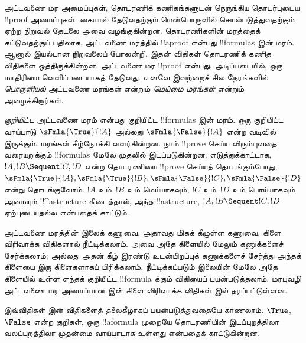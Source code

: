 \documentclass[../../../include/open-logic-section]{subfiles}
\begin{document}


அட்டவணை மர அமைப்புகள், தொடரணிக் கணிதங்களுடன் நெருங்கிய
தொடர்புடைய !!{proof} அமைப்புகள். கையால் தேடுவதற்கும்
மென்பொருளில் செயல்படுத்துவதற்கும் ஏற்ற நிறுவல் தேடலை அவை
வழங்குகின்றன. தொடரணிகளின் மரத்தைக் கட்டுவதற்குப் பதிலாக,
அட்டவணை மரத்தில் !!a{proof} என்பது !!{formula}s இன் மரம்.
ஆனால் இயல்பான நிறுவலைப் போலன்றி, இதன் விதிகள் தொடரணிக்
கணித விதிகளை ஒத்திருக்கின்றன. அட்டவணை மர !!{proof} என்பது,
அடிப்படையில், ஒரு மாதிரியை வெளிப்படையாகத் தேடுவது.
எனவே இவற்றைச் சில நேரங்களில் \emph{பொருளியல்} அட்டவணை
மரங்கள் என்றும் \emph{மெய்மை மரங்கள்} என்றும் அழைக்கிறார்கள்.

\emph{குறியிட்ட} அட்டவணை மரம் என்பது குறியிட்ட
!!{formula}s இன் மரம். ஒரு குறியிட்ட வாய்பாடு
$\sFmla{\True}{!A}$ அல்லது $\sFmla{\False}{!A}$
என்ற வடிவில் இருக்கும். மரங்கள் கீழ்நோக்கி வளர்கின்றன.
நாம் !!{prove} செய்ய விரும்புவதை வரையறுக்கும்
!!{formula}s மேலே முதலில் இடப்படுகின்றன. எடுத்துக்காட்டாக,
$!A, !B \Sequent !C, !D$ என்ற தொடரணியை
!!{prove} செய்யத் தொடங்கும்போது,
$\sFmla{\True}{!A}, \sFmla{\True}{!B},
\sFmla{\False}{!C}, \sFmla{\False}{!D}$
என்று தொடங்குவோம். $!A$ உம்~$!B$ உம் மெய்யாகவும்,
$!C$ உம்~$!D$ உம் பொய்யாகவும் அமையும்
!!^a{structure} கிடைத்தால், அந்த !!a{structure},
$!A, !B \Sequent !C, !D$ ஏற்புடையதல்ல என்பதைக் காட்டும்.

அட்டவணை மரத்தின் இலைக் கணுவை, அதாவது மிகக் கீழுள்ள
கணுவை, கிளை விரிவாக்க விதிகளால் நீட்டிக்கலாம். அவை அதே
கிளையில் மேலும் கணுக்களைச் சேர்க்கலாம்; அல்லது அதன் கீழ்
இரண்டு உடன்பிறப்புக் கணுக்களைச் சேர்த்து அந்தக் கிளையை
இரு கிளைகளாகப் பிரிக்கலாம். நீட்டிக்கப்படும் இலையின்
மேலே அதே கிளையில் உள்ள எந்தக் குறியிட்ட !!{formula}
க்கும் விதியைப் பயன்படுத்தலாம். மரபுவழி அட்டவணை மர
அமைப்பான  இன் கிளை விரிவாக்க விதிகள்
 இல் தரப்பட்டுள்ளன.



இவ்விதிகள்  இன் விதிகளைத் தலைகீழாகப்
பயன்படுத்துவதையே காணலாம். $\True$, $\False$ என்ற
குறிகள், ஒரு !!a{formula} முறையே தொடரணியின் இடப்புறத்திலா
வலப்புறத்திலா முதன்மை வாய்பாடாக உள்ளது என்பதைக் காட்டுகின்றன.
\end{document}

